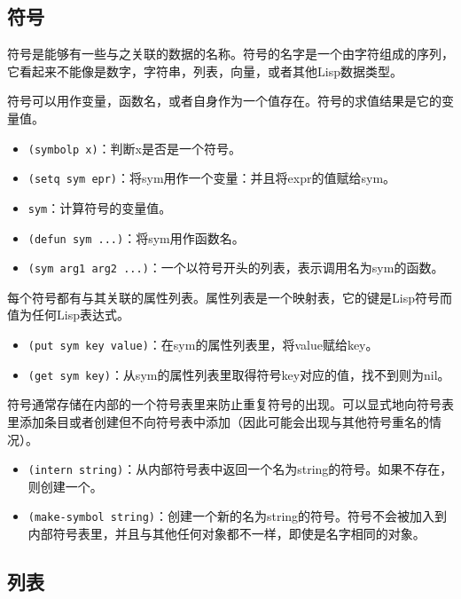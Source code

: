 \subsection{符号}
\label{section:B-Symbols}

符号是能够有一些与之关联的数据的名称。符号的名字是一个由字符组成的序列，它看起来不能像是数字，字符串，列表，向量，或者其他Lisp数据类型。

符号可以用作变量，函数名，或者自身作为一个值存在。符号的求值结果是它的变量值。

\begin{itemize}
  \item \texttt{(symbolp x)}：判断x是否是一个符号。
  \item \texttt{(setq sym epr)}：将sym用作一个变量：并且将expr的值赋给sym。
  \item \texttt{sym}：计算符号的变量值。
  \item \texttt{(defun sym ...)}：将sym用作函数名。
  \item \texttt{(sym arg1 arg2 ...)}：一个以符号开头的列表，表示调用名为sym的函数。
\end{itemize}

每个符号都有与其关联的属性列表。属性列表是一个映射表，它的键是Lisp符号而值为任何Lisp表达式。

\begin{itemize}
  \item \texttt{(put sym key value)}：在sym的属性列表里，将value赋给key。
  \item \texttt{(get sym key)}：从sym的属性列表里取得符号key对应的值，找不到则为nil。
\end{itemize}

符号通常存储在内部的一个符号表里来防止重复符号的出现。可以显式地向符号表里添加条目或者创建但不向符号表中添加（因此可能会出现与其他符号重名的情况）。

\begin{itemize}
  \item \texttt{(intern string)}：从内部符号表中返回一个名为string的符号。如果不存在，则创建一个。
  \item \texttt{(make-symbol string)}：创建一个新的名为string的符号。符号不会被加入到内部符号表里，并且与其他任何对象都不一样，即使是名字相同的对象。
\end{itemize}

\subsection{列表}
\label{section:B-Lists}

